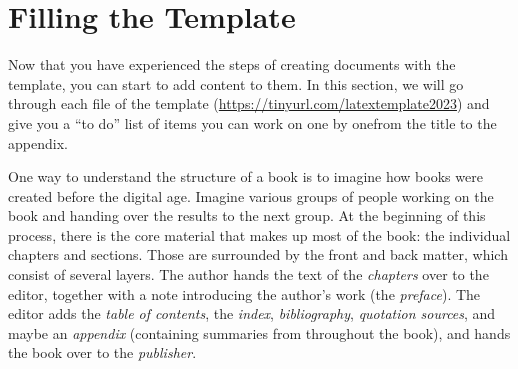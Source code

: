 

\chapter{Filling the Template}\label{fillingthetemplate:cha}

Now that you have experienced the steps of creating documents with the template, you can start to add content to them. In this section, we will go through each file of the template (\url{https://tinyurl.com/latextemplate2023}) and give you a ``to do'' list of items you can work on one by one\emdash{}from the title to the appendix.

One way to understand the structure of a book is to imagine how books were created before the digital age. Imagine various groups of people working on the book and handing over the results to the next group. At the beginning of this process, there is the core material that makes up most of the book: the individual chapters and sections. Those are surrounded by the front and back matter, which consist of several layers. The author hands the text of the \textit{chapters} over to the editor, together with a note introducing the author's work (the \textit{preface}). The editor adds the \textit{table of contents}, the \textit{index}, \textit{bibliography}, \textit{quotation sources}, and maybe an \textit{appendix} (containing summaries from throughout the book), and hands the book over to the \textit{publisher}. 

